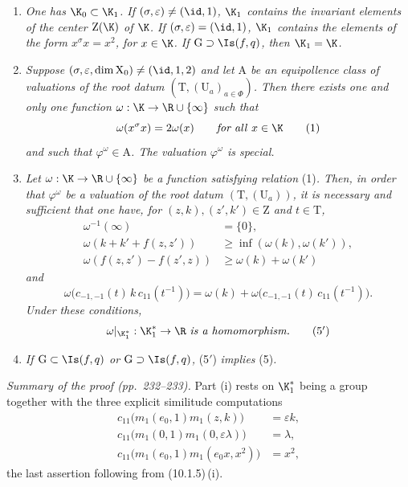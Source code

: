 \documentclass[12pt,a4paper,oneside,english]{smfart}
\theoremstyle{definition}
\theoremstyle{bt}
\begin{document}
\begin{enumerate}[label=(\roman*),leftmargin=2.5em]
\item \emph{One has $\K_0\subset\K_1$. If $(\sigma,\varepsilon)\neq(\id,1)$,
$\K_1$ contains the invariant elements of the center $\mathrm{Z}(\K)$ of $\K$.
If $(\sigma,\varepsilon)=(\id,1)$, $\K_1$ contains the elements of the form
$x^{\sigma}x=x^{2}$, for $x\in\K$. If $\mathrm{G}\supset \Is(f,q)$, then
$\K_1=\K$.}

\item \emph{Suppose $(\sigma,\varepsilon,\dim \mathrm{X}_0)\neq(\id,1,2)$ and
let $\mathrm{A}$ be an equipollence class of valuations of the root datum
$(\mathrm{T},(\mathrm{U}_a)_{a\in\Phi})$. Then there exists one and only one
function $\omega:\K\to\R\cup\{\infty\}$ such that}
\begin{equation*}
\omega(x^{\sigma}x)=2\omega(x)\qquad\text{\emph{for all} } x\in\K
\tag{1}
\end{equation*}
\emph{and such that $\varphi^{\omega}\in\mathrm{A}$. The valuation
$\varphi^{\omega}$ is special.}

\item \emph{Let $\omega:\K\to\R\cup\{\infty\}$ be a function satisfying relation}
(1)\emph{. Then, in order that $\varphi^{\omega}$ be a valuation of the root
datum $(\mathrm{T},(\mathrm{U}_a))$, it is necessary and sufficient that one
have, for $(z,k),(z',k')\in\mathrm{Z}$ and $t\in\mathrm{T}$,}
\begin{align}
\omega^{-1}(\infty)&=\{0\},\tag{2}\\
\omega(k+k'+f(z,z'))&\geqslant\inf(\omega(k),\omega(k')),\tag{3}\\
\omega(f(z,z')-f(z',z))&\geqslant\omega(k)+\omega(k')\tag{4}
\end{align}
\emph{and}
\begin{equation}
\omega\bigl(c_{-1,-1}(t)\,k\,c_{11}(t^{-1})\bigr)
=\omega(k)+\omega\bigl(c_{-1,-1}(t)\,c_{11}(t^{-1})\bigr).\tag{5}
\end{equation}
\emph{Under these conditions,}
\begin{equation}
\omega|_{\K_1^{*}}:\K_1^{*}\to\R \text{ \emph{is a homomorphism.}}\tag{5$'$}
\end{equation}

\item \emph{If $\mathrm{G}\subset \Is(f,q)$ or $\mathrm{G}\supset \Is(f,q)$,}
(5$'$) \emph{implies} (5)\emph{.}
\end{enumerate}

\pf
\emph{Summary of the proof (pp.~232--233).} Part (i) rests on $\K_1^{*}$ being a
group together with the three explicit similitude computations
\[
\begin{aligned}
c_{11}\bigl(m_1(e_0,1)m_1(z,k)\bigr)&=\varepsilon k,\\
c_{11}\bigl(m_1(0,1)m_1(0,\varepsilon\lambda)\bigr)&=\lambda,\\
c_{11}\bigl(m_1(e_0,1)m_1(e_0x,x^{2})\bigr)&=x^{2},
\end{aligned}
\]
the last assertion following from (10.1.5)\,(i).
\end{document}
